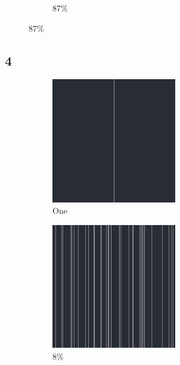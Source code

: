 \documentclass[12pt, fleqn]{report}                             %
\theoremstyle{break}                                            %
\begin{document}
\begin{figure}[ht!]
\begin{subfigure}[b]{0.4\linewidth}
          \caption{87\%}
        \end{subfigure}
      \end{figure}


      \clearpage
      \subsection{4}
      \begin{figure}[ht!]
        \centering
        \begin{subfigure}[b]{0.4\linewidth}
          \includegraphics[width=0.6\textwidth]{Images/4/a.png}
          \caption{One}
        \end{subfigure}
        \begin{subfigure}[b]{0.4\linewidth}
          \includegraphics[width=0.6\textwidth]{Images/4/b.png}
          \caption{8\%}
        \end{subfigure}
        \begin{subfigure}[b]{0.4\linewidth}

\end{subfigure}
\end{figure}
\end{document}
